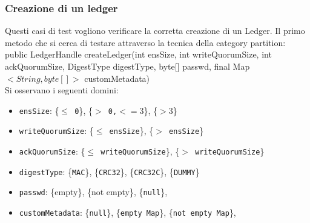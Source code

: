 \documentclass[10pt]{article}
\begin{document}
	\subsubsection{Creazione di un ledger}
	Questi casi di test vogliono verificare la corretta creazione di un Ledger.
	Il primo metodo che si cerca di testare attraverso la tecnica della category partition: \\
	public LedgerHandle createLedger(int ensSize, int writeQuorumSize, int ackQuorumSize, DigestType digestType, byte[] passwd, final Map\texttt{$<String, byte[]>$} customMetadata)\\
	Si osservano i seguenti domini:
	\begin{itemize}[label=--, itemsep=2pt, parsep=0pt]
		\item \texttt{ensSize}: \{\texttt{$\le$ 0}\}, \{\texttt{$>$ 0,$<=3$}\}, \{\texttt{$>3$}\}
		\item \texttt{writeQuorumSize}: \{\texttt{$\le$ ensSize}\}, \{\texttt{$>$ ensSize}\}
		\item \texttt{ackQuorumSize}: \{\texttt{$\le$ writeQuorumSize}\}, \{\texttt{$>$ writeQuorumSize}\}
		\item \texttt{digestType}: \{\texttt{MAC}\}, \{\texttt{CRC32}\}, \{\texttt{CRC32C}\}, \{\texttt{DUMMY}\}
		\item \texttt{passwd}: \{empty\}, \{not empty\}, \{\texttt{null}\},
		\item \texttt{customMetadata}:  \{\texttt{null}\}, \{\texttt{empty Map}\}, \{\texttt{not empty Map}\},
	\end{itemize}
\end{document}
